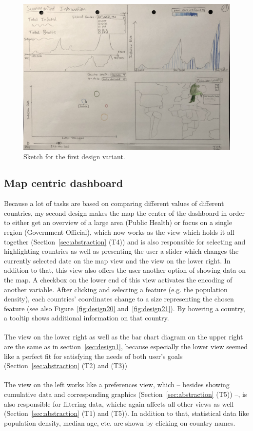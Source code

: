 \documentclass[11pt]{article}
\begin{document}
\begin{figure}[!htb]
    \centering
    \includegraphics[width=\linewidth]{images/design10.jpg}
    \caption{Sketch for the first design variant.}
    \label{fig:design10}
\end{figure}

\subsection{Map centric dashboard}
\label{sec:design2}
Because a lot of tasks are based on comparing different values of different countries, my second design makes the map the center of the dashboard in order to 
either get an overview of a large area (Public Health) or focus on a single region (Government Official), which now works as the view which holds 
it all together (Section~\ref{sec:abstraction} (T4)) and is also responsible for selecting and highlighting countries as well as presenting the user a slider 
which changes the currently selected date on the map view and the view on the lower right. 
In addition to that, this view also offers the user another option of showing data on the map. A checkbox on the lower end of this view activates the encoding 
of another variable. After clicking and selecting a feature (e.g. the population density), each countries' coordinates change to a size representing the chosen 
feature (see also Figure~\ref{fig:design20} and~\ref{fig:design21}). 
By hovering a country, a tooltip shows additional information on that country.
\\\\
The view on the lower right as well as the bar chart diagram on the upper right are the same as in section~\ref{sec:design1}, because especially the lower view 
seemed like a perfect fit for satisfying the needs of both user's goals (Section~\ref{sec:abstraction} (T2) and (T3))
\\\\
The view on the left works like a preferences view, which -- besides showing cumulative data and corresponding graphics (Section~\ref{sec:abstraction} (T5)) --, 
is also responsible for filtering data, whiche again affects all other views as well (Section~\ref{sec:abstraction} (T1) and (T5)). In addition to that, 
statistical data like population density, median age, etc. are shown by clicking on country names. 
\end{document}
